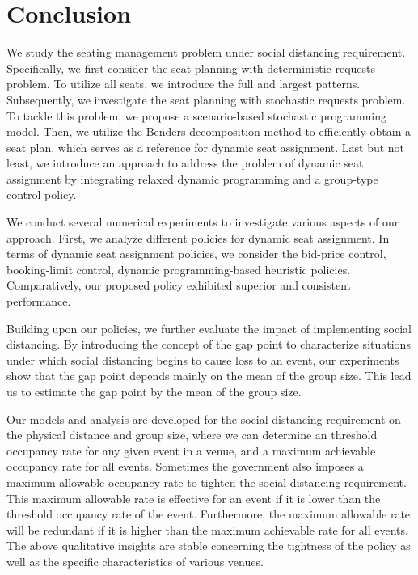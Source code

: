 \section{Conclusion}\label{sec_conclusion}
We study the seating management problem under social distancing requirement. Specifically, we first consider the seat planning with deterministic requests problem. To utilize all seats, we introduce the full and largest patterns. Subsequently, we investigate the seat planning with stochastic requests problem. To tackle this problem, we propose a scenario-based stochastic programming model. Then, we utilize the Benders decomposition method to efficiently obtain a seat plan, which serves as a reference for dynamic seat assignment. Last but not least, we introduce an approach to address the problem of dynamic seat assignment by integrating relaxed dynamic programming and a group-type control policy. 

We conduct several numerical experiments to investigate various aspects of our approach. First, we analyze different policies for dynamic seat assignment. In terms of dynamic seat assignment policies, we consider the bid-price control, booking-limit control, dynamic programming-based heuristic policies. Comparatively, our proposed policy exhibited superior and consistent performance.

Building upon our policies, we further evaluate the impact of implementing social distancing. By introducing the concept of the gap point to characterize situations under which social distancing begins to cause loss to an event, our experiments show that the gap point depends mainly on the mean of the group size. This lead us to estimate the gap point by the mean of the group size.


Our models and analysis are developed for the social distancing requirement on the physical distance and group size, where we can determine an threshold occupancy rate for any given event in a venue, and a maximum achievable occupancy rate for all events. Sometimes the government also imposes a maximum allowable occupancy rate to tighten the social distancing requirement. This maximum allowable rate is effective for an event if it is lower than the threshold occupancy rate of the event. Furthermore,
the maximum allowable rate will be redundant if it is higher than the maximum achievable rate for all
events. The above qualitative insights are stable concerning the tightness of the policy as well as the specific characteristics of various venues.


